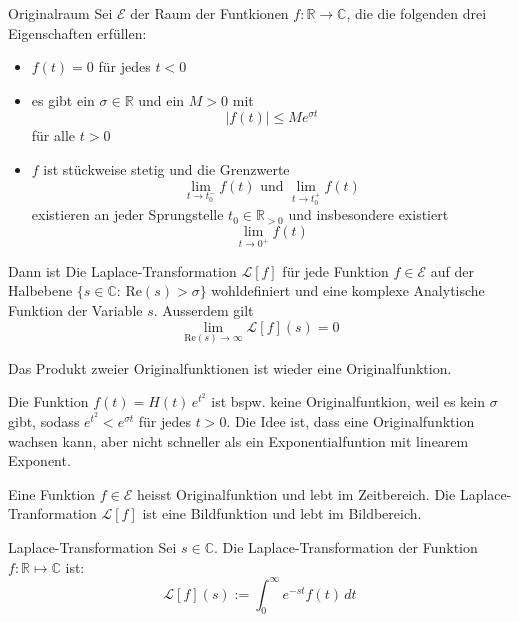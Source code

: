 \documentclass[a4paper,10pt]{article}
\def\R{\mathbb{R}}
\def\C{\mathbb{C}}
\def\Re{\text{Re}}
\begin{document}
\begin{subbox}{Originalraum}
  Sei \(\mathcal{E}\) der Raum der Funtkionen \(f\colon\mathbb{R}\to\mathbb{C}\), die die folgenden drei Eigenschaften erfüllen:
  \begin{itemize}
    \item \(f(t)=0\) für jedes \(t<0\)
    \item es gibt ein \(\sigma\in\mathbb{R}\) und ein \(M>0\) mit \begin{equation*} |f(t)|\leq Me^{\sigma t} \end{equation*} für alle \(t>0\)
    \item{
      \(f\) ist stückweise stetig und die Grenzwerte \begin{equation*} \lim_{t\to t_0^-}f(t)\text{ und }\lim_{t\to t_0^+}f(t) \end{equation*} existieren an jeder Sprungstelle \(t_0\in\mathbb{R}_{>0}\) und insbesondere existiert \begin{equation*} \lim_{t\to 0^+}f(t) \end{equation*}
    }
  \end{itemize}

Dann ist Die Laplace-Transformation \(\mathcal{L}[f]\) für jede Funktion \(f\in \mathcal{E}\) auf der Halbebene \(\{s\in\mathbb{C}:\,\Re (s)>\sigma\}\) wohldefiniert und eine komplexe Analytische Funktion der Variable \(s\). Ausserdem gilt \begin{equation*} \lim_{\Re (s)\to\infty}\mathcal{L}[f](s)=0 \end{equation*}
\end{subbox}

Das Produkt zweier Originalfunktionen ist wieder eine Originalfunktion.

Die Funktion \(f(t)=H(t)\,e^{t^2}\) ist bspw. keine Originalfuntkion, weil es kein \(\sigma\) gibt, sodass \(e^{t^2} < e^{\sigma t}\) für jedes \(t > 0\). Die Idee ist, dass eine Originalfunktion wachsen kann, aber nicht schneller als ein Exponentialfuntion mit linearem Exponent.

Eine Funktion $f \in \mathcal{E}$ heisst Originalfunktion und lebt im Zeitbereich. Die Laplace-Tranformation $\mathcal{L}[f]$ ist eine Bildfunktion und lebt im Bildbereich.

\begin{mainbox}{Laplace-Transformation}
  Sei $s \in \C$. Die Laplace-Transformation der Funktion $f: \R \mapsto \C$ ist:
  \begin{equation*}
    \mathcal{L}[f](s):=\int_0^\infty e^{-st}f(t)\,dt
\end{equation*}
\end{mainbox}
\end{document}
